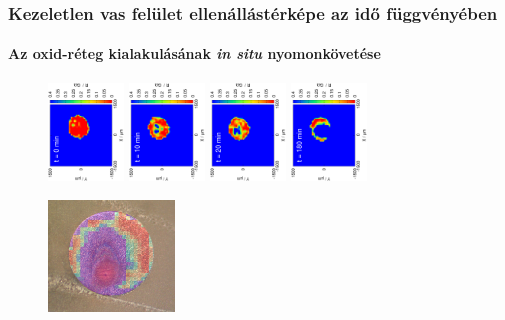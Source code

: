 \documentclass{beamer}
\begin{document}
\begin{frame}
\frametitle{Kezeletlen vas felület ellenállástérképe az idő függvényében}
\framesubtitle{Az oxid-réteg kialakulásának \emph{in situ} nyomonkövetése}
\begin{figure}
\centering
\includegraphics[trim = 15mm 30mm 0mm 15mm, clip, width=0.18\textwidth, angle=-90]{17052401_r.eps}
\includegraphics[trim = 15mm 30mm 0mm 15mm, clip, width=0.18\textwidth, angle=-90]{17052402_r.eps}
\includegraphics[trim = 15mm 30mm 0mm 15mm, clip, width=0.18\textwidth, angle=-90]{17052403_r.eps}
\includegraphics[trim = 15mm 30mm 0mm 15mm, clip, width=0.18\textwidth, angle=-90]{17052405_r.eps}

\vspace{1cm}

\includegraphics[width=0.3\textwidth]{img2.png}

\end{figure}
\end{frame}
\end{document}
